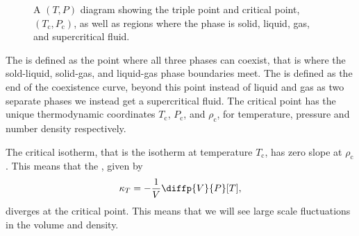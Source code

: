 \documentclass[fleqn]{NotesClass}
\begin{document}
    \begin{figure}
        \caption[Phase diagram]{A \((T, P)\) diagram showing the triple point and critical point, \((T_{\mathrm{c}}, P_{\mathrm{c}})\), as well as regions where the phase is solid, liquid, gas, and supercritical fluid.}
        \label{fig:phase diagram}
    \end{figure}
    
    The  is defined as the point where all three phases can coexist, that is where the sold-liquid, solid-gas, and liquid-gas phase boundaries meet.
    The  is defined as the end of the coexistence curve, beyond this point instead of liquid and gas as two separate phases we instead get a supercritical fluid.
    The critical point has the unique thermodynamic coordinates \(T_{\mathrm{c}}\), \(P_{\mathrm{c}}\), and \(\rho_{\mathrm{c}}\), for temperature, pressure and number density respectively.
    
    The critical isotherm, that is the isotherm at temperature \(T_{\mathrm{c}}\), has zero slope at \(\rho_{\mathrm{c}}\).
    This means that the , given by
    \begin{equation}
        \kappa_{T} = -\frac{1}{V} \diffp{V}{P}[T],
    \end{equation}
    diverges at the critical point.
    This means that we will see large scale fluctuations in the volume and density.
    
\end{document}
